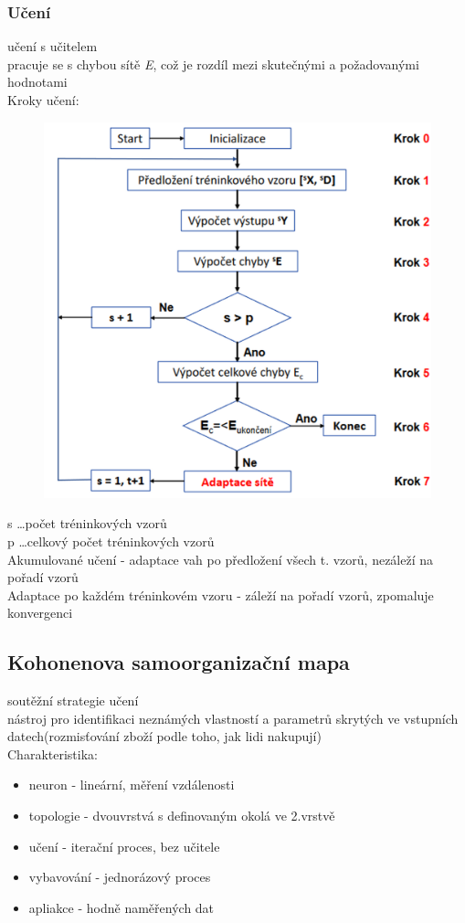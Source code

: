 \subsubsection*{Učení}
učení s učitelem\\
pracuje se s chybou sítě \textit{E}, což je rozdíl mezi skutečnými a požadovanými hodnotami\\
Kroky učení:
\begin{figure}[H]
    \includegraphics[scale = 0.3]{images/backPropag_uceni.png}
\end{figure}
s \dots počet tréninkových vzorů\\
p \dots celkový počet tréninkových vzorů\\
Akumulované učení - adaptace vah po předložení všech t. vzorů, nezáleží na pořadí vzorů\\
Adaptace po každém tréninkovém vzoru - záleží na pořadí vzorů, zpomaluje konvergenci

\subsection*{Kohonenova samoorganizační mapa}
soutěžní strategie učení\\
nástroj pro identifikaci neznámých vlastností a parametrů skrytých ve vstupních datech(rozmisťování zboží podle toho, jak lidi nakupují)\\
Charakteristika:
\begin{itemize}
    \item neuron - lineární, měření vzdálenosti
    \item topologie - dvouvrstvá s definovaným okolá ve 2.vrstvě
    \item učení - iterační proces, bez učitele
    \item vybavování - jednorázový proces
    \item apliakce - hodně naměřených dat
\end{itemize}
